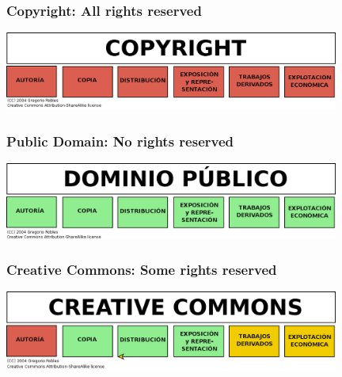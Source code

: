 
\begin{frame}
\frametitle{Copyright: All rights reserved}

\includegraphics[width=11cm]{figs/Copyright.png}

\end{frame}


\begin{frame}
\frametitle{Public Domain: No rights reserved}

\includegraphics[width=11cm]{figs/DominioPublico.png}

\end{frame}


\begin{frame}
\frametitle{Creative Commons: Some rights reserved}

\includegraphics[width=11cm]{figs/CreativeCommons.png}

\end{frame}


